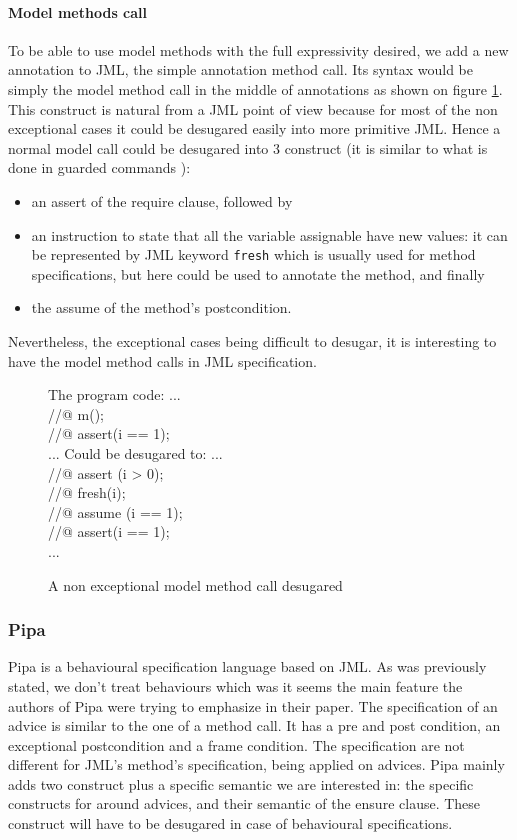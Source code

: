 \paragraph{Model methods call}
To be able to use model methods with the full expressivity desired, we add a new annotation to JML, the simple 
annotation method call. Its syntax would be simply the model method call in the middle of annotations as shown 
on figure \ref{model_meth}. This construct is natural from a JML point of view because for most of the non 
exceptional cases  it could be desugared easily into 
more primitive JML. Hence a normal model call could be desugared into 3 construct (it is similar to what is done
in guarded commands \cite{BarnettL05}):
\begin{itemize} 
\item an assert of the require clause, followed by 
\item an  instruction to state that all the variable assignable have new values: it can be represented by JML 
keyword {\tt fresh} which is usually used for method specifications, but here could be used to annotate the method, 
and finally 
\item the assume of the method's postcondition.
\end{itemize}
Nevertheless, the exceptional cases being difficult to desugar, it is interesting to have the model method calls in
JML specification.

\begin{figure}
\begin{center}\begin{minipage}{4cm}
The program code:
\bcode
...\\
//@ m();\\
//@ assert(i == 1);\\
...
\ecode
Could be desugared to:
\bcode
...\\
//@ assert (i > 0);\\
//@ fresh(i);\\
//@ assume (i == 1);\\
//@ assert(i == 1);\\
...
\ecode
\end{minipage}\end{center}
\caption{A non exceptional model method call desugared}
\label{model_meth}
\end{figure}
\subsubsection{Pipa}
Pipa is a behavioural specification language based on JML. As was previously stated, we don't treat behaviours 
which was it seems the main feature the authors of Pipa were trying to emphasize in their paper.
The specification of an advice is similar to the one of a method call. It has a pre and post condition,
an exceptional postcondition and a frame condition. The specification are not different for JML's method's 
specification, being applied on advices.
Pipa mainly adds two construct plus a specific semantic we are interested in:
the specific constructs for around advices, and their semantic of the ensure clause. These construct will have
to be desugared in case of behavioural specifications.



